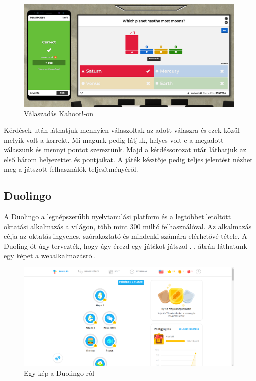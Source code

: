 \begin{figure}[h]
  \centering
  \includegraphics[width=\textwidth]{images/kahoot_play2.png}
  \caption{Válaszadás Kahoot!-on}
\end{figure}

Kérdések után láthatjuk mennyien válaszoltak az adott válaszra és ezek közül melyik volt a korrekt. Mi magunk pedig látjuk, helyes volt-e a megadott válaszunk és mennyi pontot szereztünk. Majd a kérdéssorozat után láthatjuk az első három helyezettet és pontjaikat. A játék késztője pedig teljes jelentést nézhet meg a játszott felhasználók teljesítményéről.

\subsection{Duolingo}

A Duolingo a legnépszerűbb nyelvtanulási platform és a legtöbbet letöltött oktatási alkalmazás a világon, több mint 300 millió felhasználóval. Az alkalmazás célja az oktatás ingyenes, szórakoztató és mindenki számára elérhetővé tétele. A Duoling-ót úgy tervezték, hogy úgy érezd egy játékot játszol \cite{whatIsDuolingo}.
. ábrán láthatunk egy képet a webalkalmazásról.

\begin{figure}[h]
  \centering
  \includegraphics[width=\textwidth]{images/Duolingo_main_page.png}
  \caption{Egy kép a Duolingo-ról}
  \label{fig:duolingo}
\end{figure}

